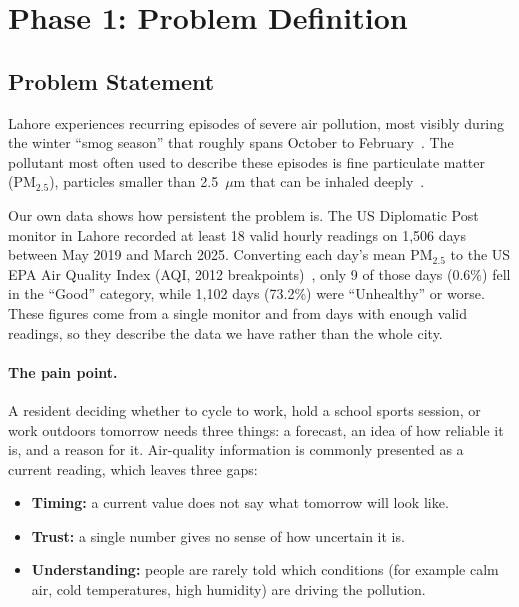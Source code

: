 
\section{Phase 1: Problem Definition}

\subsection{Problem Statement}

Lahore experiences recurring episodes of severe air pollution, most visibly during the winter ``smog season'' that roughly spans October to February~\cite{majeed2024lahore}. The pollutant most often used to describe these episodes is fine particulate matter (PM$_{2.5}$), particles smaller than 2.5~$\mu$m that can be inhaled deeply~\cite{who2024ambient,epa_pm_basics}.

Our own data shows how persistent the problem is. The US Diplomatic Post monitor in Lahore recorded at least 18 valid hourly readings on 1{,}506 days between May 2019 and March 2025. Converting each day's mean PM$_{2.5}$ to the US EPA Air Quality Index (AQI, 2012 breakpoints)~\cite{epa_aqi_tad}, only 9 of those days (0.6\%) fell in the ``Good'' category, while 1{,}102 days (73.2\%) were ``Unhealthy'' or worse. These figures come from a single monitor and from days with enough valid readings, so they describe the data we have rather than the whole city.

\paragraph{The pain point.} A resident deciding whether to cycle to work, hold a school sports session, or work outdoors tomorrow needs three things: a forecast, an idea of how reliable it is, and a reason for it. Air-quality information is commonly presented as a current reading, which leaves three gaps:
\begin{itemize}
  \item \textbf{Timing:} a current value does not say what tomorrow will look like.
  \item \textbf{Trust:} a single number gives no sense of how uncertain it is.
  \item \textbf{Understanding:} people are rarely told which conditions (for example calm air, cold temperatures, high humidity) are driving the pollution.
\end{itemize}

